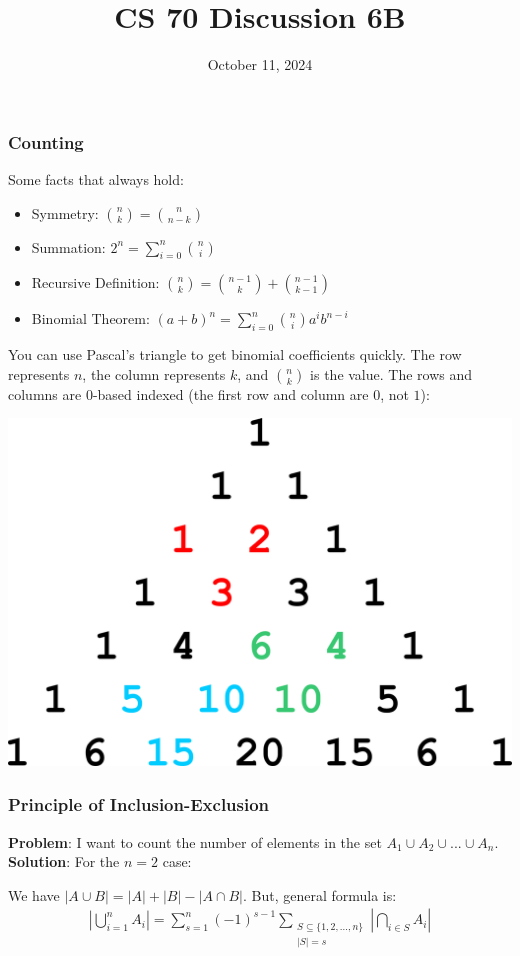 \documentclass{beamer}
\title{CS 70 Discussion 6B}
\date{October 11, 2024}
\begin{document}
\frame{\titlepage}

\begin{frame}
    \frametitle{Counting}
    Some facts that always hold:
    \begin{itemize}
        \item Symmetry: $\binom{n}{k}=\binom{n}{n-k}$
        \item Summation: $2^n=\sum_{i=0}^n\binom{n}{i}$
        \item Recursive Definition: $\binom{n}{k}=\binom{n-1}{k}+\binom{n-1}{k-1}$
        \item Binomial Theorem: $(a+b)^n=\sum_{i=0}^n\binom{n}{i}a^ib^{n-i}$
    \end{itemize}
    You can use Pascal's triangle to get binomial coefficients quickly. The row represents $n$, the column represents $k$, and $\binom{n}{k}$ is the value. The rows and columns are $0$-based indexed (the first row and column are $0$, not $1$):
    \begin{center}
        \includegraphics[scale=0.15]{Images/pascal-triangle.png}
    \end{center}

\end{frame}

\begin{frame}
    \frametitle{Principle of Inclusion-Exclusion}
    {\bf Problem}: I want to count the number of elements in the set $A_1\cup A_2\cup...\cup A_n$.\\
    {\bf Solution}: For the $n=2$ case:\\
    \begin{center}
    \end{center}
    We have $|A\cup B|=|A|+|B|-|A\cap B|$. But, general formula is:
    \begin{gather*}
        \left|\bigcup_{i=1}^n A_i\right|=\sum_{s=1}^n(-1)^{s-1}\sum_{\substack{S\subseteq\{1,2,...,n\}\\|S|=s}}\left|\bigcap_{i\in S}A_i\right|
    \end{gather*}
\end{frame}
\end{document}
